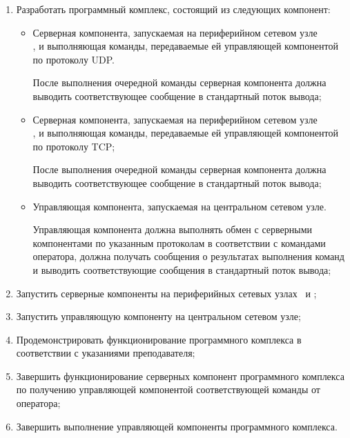 	\begin{enumerate}

		\item Разработать программный комплекс, состоящий из следующих компонент:

			\begin{itemize}

				\item Серверная компонента, запускаемая на периферийном сетевом узле\\\first, и выполняющая команды,
				передаваемые ей управляющей компонентой по протоколу UDP.

				После выполнения очередной команды серверная компонента должна выводить соответствующее сообщение
				в стандартный поток вывода;

				\item Серверная компонента, запускаемая на периферийном сетевом узле\\\second, и выполняющая команды,
				передаваемые ей управляющей компонентой по протоколу TCP;

				После выполнения очередной команды серверная компонента должна выводить соответствующее сообщение
				в стандартный поток вывода;

				\item Управляющая компонента, запускаемая на центральном сетевом узле.

				Управляющая компонента должна выполнять обмен с серверными компонентами по указанным протоколам
				в соответствии с командами оператора, должна получать сообщения о результатах выполнения команд
				и выводить соответствующие сообщения в стандартный поток вывода;

			\end{itemize}

		\item Запустить серверные компоненты на периферийных сетевых узлах \first\ и \second;
		\item Запустить управляющую компоненту на центральном сетевом узле;
		\item Продемонстрировать функционирование программного комплекса в соответствии с указаниями преподавателя;
		\item Завершить функционирование серверных компонент программного комплекса по получению управляющей
		компонентой соответствующей команды от оператора;
		\item Завершить выполнение управляющей компоненты программного комплекса.

	\end{enumerate}

